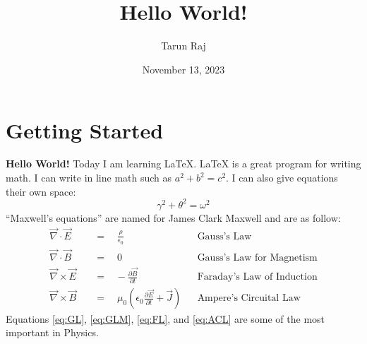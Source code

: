 \documentclass{article}
\title{\noindent
\\Hello World!}
\author{Tarun Raj}
\date{November 13, 2023}
\begin{document}
    \maketitle
    \thispagestyle{empty}
    \section{Getting Started}
    \textbf{Hello World!} Today I am learning \LaTeX. \LaTeX{} is a great program for writing math. I can write in line math such as $a^2+b^2=c^2$. I can also give equations their own space: 
    \begin{equation} 
    \gamma^2+\theta^2=\omega^2
    \end{equation}
    ``Maxwell's equations'' are named for James Clark Maxwell and are as follow:
    \begin{align}             
    \vec{\nabla} \cdot \vec{E} \quad &=\quad\frac{\rho}{\epsilon_0} &&\text{Gauss's Law} \label{eq:GL}\\      
    \vec{\nabla} \cdot \vec{B} \quad &=\quad 0 &&\text{Gauss's Law for Magnetism} \label{eq:GLM}\\
    \vec{\nabla} \times \vec{E} \quad &=\hspace{10pt}-\frac{\partial{\vec{B}}}{\partial{t}} &&\text{Faraday's Law of Induction} \label{eq:FL}\\ 
    \vec{\nabla} \times \vec{B} \quad &=\quad \mu_0\left( \epsilon_0\frac{\partial{\vec{E}}}{\partial{t}}+\vec{J}\right) &&\text{Ampere's Circuital Law} \label{eq:ACL}
    \end{align}
Equations \ref{eq:GL}, \ref{eq:GLM}, \ref{eq:FL}, and \ref{eq:ACL} are some of the most important in Physics.
\end{document}
